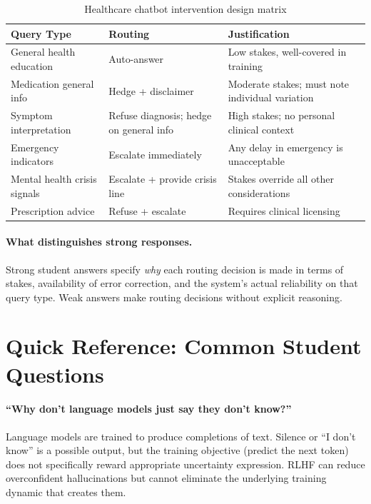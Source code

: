 \begin{table}[htbp]
\caption{Healthcare chatbot intervention design matrix}
\label{tab:healthcare-chatbot}
\centering
\begin{tabular}{@{}p{3.5cm}p{2.5cm}p{5cm}@{}}
\toprule
\textbf{Query Type} & \textbf{Routing} & \textbf{Justification} \\
\midrule
General health education & Auto-answer & Low stakes, well-covered in training \\
Medication general info & Hedge + disclaimer & Moderate stakes; must note individual variation \\
Symptom interpretation & Refuse diagnosis; hedge on general info & High stakes; no personal clinical context \\
Emergency indicators & Escalate immediately & Any delay in emergency is unacceptable \\
Mental health crisis signals & Escalate + provide crisis line & Stakes override all other considerations \\
Prescription advice & Refuse + escalate & Requires clinical licensing \\
\bottomrule
\end{tabular}
\end{table}

\paragraph{What distinguishes strong responses.}

Strong student answers specify \emph{why} each routing decision is made in terms of stakes, availability of error correction, and the system's actual reliability on that query type. Weak answers make routing decisions without explicit reasoning.

\section{Quick Reference: Common Student Questions}

\paragraph{``Why don't language models just say they don't know?''}
Language models are trained to produce completions of text. Silence or ``I don't know'' is a possible output, but the training objective (predict the next token) does not specifically reward appropriate uncertainty expression. RLHF can reduce overconfident hallucinations but cannot eliminate the underlying training dynamic that creates them.

